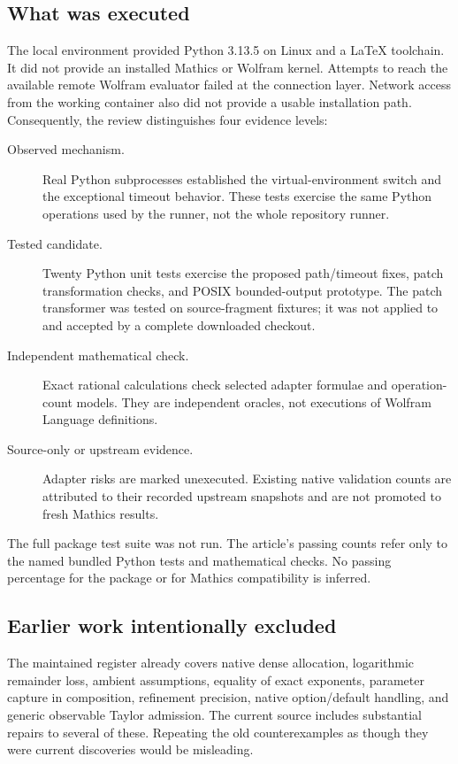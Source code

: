 \documentclass[11pt,letterpaper]{article}
\begin{document}
\subsection{What was executed}

The local environment provided Python 3.13.5 on Linux and a LaTeX toolchain. It did not provide an installed Mathics or Wolfram kernel. Attempts to reach the available remote Wolfram evaluator failed at the connection layer. Network access from the working container also did not provide a usable installation path. Consequently, the review distinguishes four evidence levels:

\begin{description}
\item[Observed mechanism.] Real Python subprocesses established the virtual-environment switch and the exceptional timeout behavior. These tests exercise the same Python operations used by the runner, not the whole repository runner.
\item[Tested candidate.] Twenty Python unit tests exercise the proposed path/timeout fixes, patch transformation checks, and POSIX bounded-output prototype. The patch transformer was tested on source-fragment fixtures; it was not applied to and accepted by a complete downloaded checkout.
\item[Independent mathematical check.] Exact rational calculations check selected adapter formulae and operation-count models. They are independent oracles, not executions of Wolfram Language definitions.
\item[Source-only or upstream evidence.] Adapter risks are marked unexecuted. Existing native validation counts are attributed to their recorded upstream snapshots and are not promoted to fresh Mathics results.
\end{description}

The full package test suite was not run. The article's passing counts refer only to the named bundled Python tests and mathematical checks. No passing percentage for the package or for Mathics compatibility is inferred.

\subsection{Earlier work intentionally excluded}

The maintained register already covers native dense allocation, logarithmic remainder loss, ambient assumptions, equality of exact exponents, parameter capture in composition, refinement precision, native option/default handling, and generic observable Taylor admission. The current source includes substantial repairs to several of these. Repeating the old counterexamples as though they were current discoveries would be misleading.~\cite{status,wave3}
\end{document}
